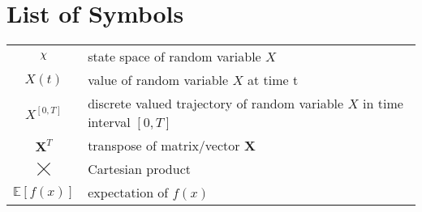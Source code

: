 \chapter*{List of Symbols}

\begin{tabular}{cp{}}
	$ \rchi $ & state space of random variable $ X $ \\
	$ X(t) $ & value of random variable $X$ at time t \\
	$ X^{[0, T]} $ & discrete valued trajectory of random variable $ X $ in time interval $ [0, T] $ \\
	$ \textbf{X}^T $ & transpose of matrix/vector \textbf{X} \\
	$ ⨉ $ & Cartesian product \\
	$ \mathbb{E}\left[ f(x) \right]  $ & expectation of $ f(x) $
\end{tabular}\\
